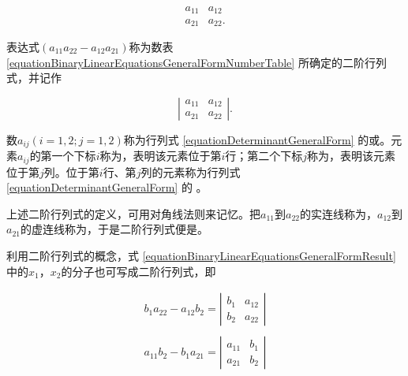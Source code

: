 \begin{equation} \label{equationBinaryLinearEquationsGeneralFormNumberTable}
\begin{array}{cc}
a_{11} & a_{12}\\
a_{21} & a_{22}.
\end{array}
\end{equation}

表达式$ (a_{11}a_{22}-a_{12}a_{21}) $称为数表 \ref{equationBinaryLinearEquationsGeneralFormNumberTable} 所确定的二阶行列式，并记作

\begin{equation} \label{equationDeterminantGeneralForm}
\left | \begin{array}{cc}
a_{11} & a_{12}\\
a_{21} & a_{22}
\end{array} \right |.
\end{equation}

数$ a_{ij} (i=1,2;j=1,2) $称为行列式 \ref{equationDeterminantGeneralForm} 的或。元素$ a_{ij} $的第一个下标$ i $称为，表明该元素位于第$ i $行；第二个下标$ j $称为，表明该元素位于第$ j $列。位于第$ i $行、第$ j $列的元素称为行列式 \ref{equationDeterminantGeneralForm} 的 。

上述二阶行列式的定义，可用对角线法则来记忆。把$ a_{11} $到$ a_{22} $的实连线称为，$ a_{12} $到$ a_{21} $的虚连线称为，于是二阶行列式便是。

利用二阶行列式的概念，式 \ref{equationBinaryLinearEquationsGeneralFormResult} 中的$ x_{1} $，$ x_{2} $的分子也可写成二阶行列式，即

\begin{equation} \label{equationDeterminantGeneralFormResult}
	\begin{array}{r}
	b_{1}a_{22}-a_{12}b_{2} = \left | \begin{array}{cc}
	b_{1} & a_{12}\\
	b_{2} & a_{22}
	\end{array} \right | \\
	\\
	a_{11}b_{2}-b_{1}a_{21} = \left | \begin{array}{cc}
		a_{11} & b_{1}\\
		a_{21} & b_{2}
		\end{array} \right |
	\end{array}
\end{equation}

